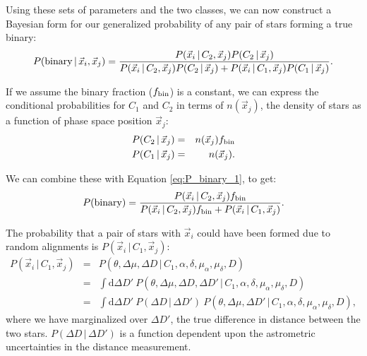 \documentclass[12pt, preprint]{aastex}
\newcommand{\given}{\,|\,}
\newcommand{\dd}{\mathrm{d}}
\begin{document}
Using these sets of parameters and the two classes, we can now construct a Bayesian form for our generalized probability of any pair of stars forming a true binary:
\begin{equation}
P({\rm binary} \given \vec{x}_i, \vec{x}_j) = \frac{P(\vec{x}_i \given C_2, \vec{x}_j) P(C_2 \given \vec{x}_j)}{P(\vec{x}_i \given C_2, \vec{x}_j) P(C_2 \given \vec{x}_j) + P(\vec{x}_i \given C_1, \vec{x}_j) P(C_1 \given \vec{x}_j)}. \label{eq:P_binary_1}
\end{equation}

If we assume the binary fraction ($f_{\rm bin}$) is a constant, we can express the conditional probabilities for $C_1$ and $C_2$ in terms of $n(\vec{x}_j)$, the density of stars as a function of phase space position $\vec{x}_j$:
\begin{eqnarray}
P(C_2 \given \vec{x}_j) &=& n(\vec{x}_j) f_{\rm bin} \\
P(C_1 \given \vec{x}_j) &=& n(\vec{x}_j).
\end{eqnarray}

We can combine these with Equation \ref{eq:P_binary_1}, to get:
\begin{equation}
P({\rm binary}) = \frac{P(\vec{x}_i \given C_2, \vec{x}_j) f_{\rm bin} }{P(\vec{x}_i \given C_2, \vec{x}_j) f_{\rm bin}  + P(\vec{x}_i \given C_1, \vec{x}_j) }. \label{eq:P_binary_2}
\end{equation}




The probability that a pair of stars with $\vec{x}_i$ could have been formed due to random alignments is $P(\vec{x}_i \given C_1, \vec{x}_j)$:
\begin{eqnarray}
P(\vec{x}_i \given C_1, \vec{x}_j) &=& P(\theta, \Delta \mu, \Delta D \given C_1, \alpha, \delta, \mu_{\alpha}, \mu_{\delta}, D ) \\
&=& \int \dd \Delta D'\ P(\theta, \Delta \mu, \Delta D, \Delta D' \given C_1, \alpha, \delta, \mu_{\alpha}, \mu_{\delta}, D ) \\
&=& \int \dd \Delta D'\ P(\Delta D \given \Delta D')\ P(\theta, \Delta \mu, \Delta D' \given C_1, \alpha, \delta, \mu_{\alpha}, \mu_{\delta}, D ), \label{eq:P_noise_marginalized}
\end{eqnarray}
where we have marginalized over $\Delta D'$, the true difference in distance between the two stars. $P(\Delta D \given \Delta D')$ is a function dependent upon the astrometric uncertainties in the distance measurement.
\end{document}
